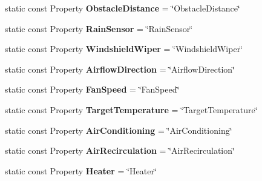 \begin{DoxyCompactItemize}
\item 
\hypertarget{classVehicleProperty_a0b3f901f17dd92086b59a1923b9124c4}{static const Property {\bfseries Obstacle\-Distance} = \char`\"{}Obstacle\-Distance\char`\"{}}\label{classVehicleProperty_a0b3f901f17dd92086b59a1923b9124c4}

\item 
\hypertarget{classVehicleProperty_aaf332f3700a7dabc3ebe138c8442c854}{static const Property {\bfseries Rain\-Sensor} = \char`\"{}Rain\-Sensor\char`\"{}}\label{classVehicleProperty_aaf332f3700a7dabc3ebe138c8442c854}

\item 
\hypertarget{classVehicleProperty_afe911cbe3c105b89c0f5b9f0163698c8}{static const Property {\bfseries Windshield\-Wiper} = \char`\"{}Windshield\-Wiper\char`\"{}}\label{classVehicleProperty_afe911cbe3c105b89c0f5b9f0163698c8}

\item 
\hypertarget{classVehicleProperty_adeeec47dbbcc60ee78b30c8c1a917836}{static const Property {\bfseries Airflow\-Direction} = \char`\"{}Airflow\-Direction\char`\"{}}\label{classVehicleProperty_adeeec47dbbcc60ee78b30c8c1a917836}

\item 
\hypertarget{classVehicleProperty_afd2a544499ec8ddc83127ef268f9e5e5}{static const Property {\bfseries Fan\-Speed} = \char`\"{}Fan\-Speed\char`\"{}}\label{classVehicleProperty_afd2a544499ec8ddc83127ef268f9e5e5}

\item 
\hypertarget{classVehicleProperty_a14d5cc6734fa65eb1e352d9ddbe05c17}{static const Property {\bfseries Target\-Temperature} = \char`\"{}Target\-Temperature\char`\"{}}\label{classVehicleProperty_a14d5cc6734fa65eb1e352d9ddbe05c17}

\item 
\hypertarget{classVehicleProperty_a45738d294fe38c6fa5f198c30b17153c}{static const Property {\bfseries Air\-Conditioning} = \char`\"{}Air\-Conditioning\char`\"{}}\label{classVehicleProperty_a45738d294fe38c6fa5f198c30b17153c}

\item 
\hypertarget{classVehicleProperty_aa5c99592d51aa0a05eb277563c2273d7}{static const Property {\bfseries Air\-Recirculation} = \char`\"{}Air\-Recirculation\char`\"{}}\label{classVehicleProperty_aa5c99592d51aa0a05eb277563c2273d7}

\item 
\hypertarget{classVehicleProperty_ad5a3fdf51333943c486fa216e894cb29}{static const Property {\bfseries Heater} = \char`\"{}Heater\char`\"{}}\label{classVehicleProperty_ad5a3fdf51333943c486fa216e894cb29}


\end{DoxyCompactItemize}
